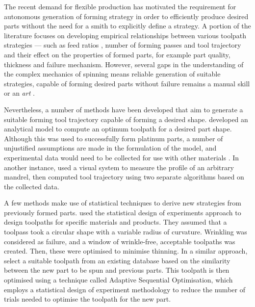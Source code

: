 The recent demand for flexible production has motivated the requirement for autonomous generation of forming strategy in order to efficiently produce desired parts without the need for a smith to explicitly define a strategy. A portion of the literature focuses on developing empirical relationships between various toolpath strategies --- such as feed ratios \citep{El-Khabeery1991OnCups,Sugar2016AnalysisSteels,Wang2011EffectsCup}, number of forming passes \citep{Hayama1970StudySpinning} and tool trajectory \citep{Gan2016AComponents,Wang2011ASpinning,Polyblank2015ParametricSpinning} and their effect on the properties of formed parts, for example part quality, thickness and failure mechanism. 
However, several gaps in the understanding of the complex mechanics of spinning means reliable generation of suitable strategies, capable of forming desired parts without failure remains a manual skill or an \textit{art} \citep{Music2010ASpinning}.


Nevertheless, a number of methods have been developed that aim to generate a suitable forming tool trajectory capable of forming a desired shape. \cite{Nzahumunyurwa2001OptimizationProcess} developed an analytical model to compute an optimum toolpath for a desired part shape. Although this was used to successfully form platinum parts, a number of unjustified assumptions are made in the formulation of the model, and experimental data would need to be collected for use with other materials \citep{Russo2020CraftsmanshipSpinning}. In another instance,  \cite{Hanafi2003VisualSpinning} used a visual system to measure the profile of an arbitrary mandrel, then computed tool trajectory using two separate algorithms based on the collected data.

A few methods make use of statistical techniques to derive new strategies from previously formed parts. \cite{Auer2004ComparisonSpinning} used the statistical design of experiments approach to design toolpaths for specific materials and products. They assumed that a toolpass took a circular shape with a variable radius of curvature. Wrinkling was considered as failure, and a window of wrinkle-free, acceptable toolpaths was created. Then, these were optimised to minimise thinning. In a similar approach, \cite{Henkenjohann2005AnProcess} select a suitable toolpath from an existing database based on the similarity between the new part to be spun and previous parts. This toolpath is then optimised using a technique called Adaptive Sequential Optimisation, which employs a statistical design of experiment methodology to reduce the number of trials needed to optimise the toolpath for the new part.


